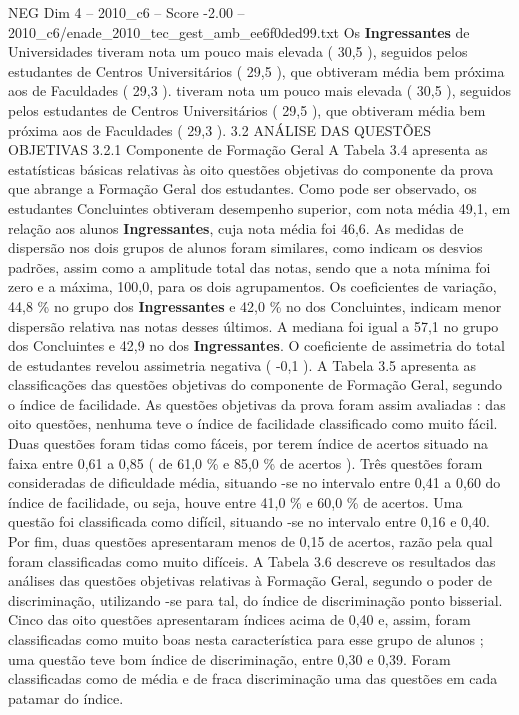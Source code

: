 \begin{textsample}{NEG Dim 4 – 2010\_c6 – Score -2.00 – 2010\_c6/enade\_2010\_tec\_gest\_amb\_ee6f0ded99.txt}
Os \textbf{Ingressantes} de Universidades tiveram nota um pouco mais elevada ( 30,5 ), seguidos pelos estudantes de Centros Universitários ( 29,5 ), que obtiveram média bem próxima aos de Faculdades ( 29,3 ). tiveram nota um pouco mais elevada ( 30,5 ), seguidos pelos estudantes de Centros Universitários ( 29,5 ), que obtiveram média bem próxima aos de Faculdades ( 29,3 ). 3.2 ANÁLISE DAS QUESTÕES OBJETIVAS 3.2.1 Componente de Formação Geral A Tabela 3.4 apresenta as estatísticas básicas relativas às oito questões objetivas do componente da prova que abrange a Formação Geral dos estudantes.
Como pode ser observado, os estudantes Concluintes obtiveram desempenho superior, com nota média 49,1, em relação aos alunos \textbf{Ingressantes}, cuja nota média foi 46,6.
As medidas de dispersão nos dois grupos de alunos foram similares, como indicam os desvios padrões, assim como a amplitude total das notas, sendo que a nota mínima foi zero e a máxima, 100,0, para os dois agrupamentos.
Os coeficientes de variação, 44,8 \% no grupo dos \textbf{Ingressantes} e 42,0 \% no dos Concluintes, indicam menor dispersão relativa nas notas desses últimos.
A mediana foi igual a 57,1 no grupo dos Concluintes e 42,9 no dos \textbf{Ingressantes}.
O coeficiente de assimetria do total de estudantes revelou assimetria negativa ( -0,1 ).
A Tabela 3.5 apresenta as classificações das questões objetivas do componente de Formação Geral, segundo o índice de facilidade.
As questões objetivas da prova foram assim avaliadas : das oito questões, nenhuma teve o índice de facilidade classificado como muito fácil.
Duas questões foram tidas como fáceis, por terem índice de acertos situado na faixa entre 0,61 a 0,85 ( de 61,0 \% e 85,0 \% de acertos ).
Três questões foram consideradas de dificuldade média, situando -se no intervalo entre 0,41 a 0,60 do índice de facilidade, ou seja, houve entre 41,0 \% e 60,0 \% de acertos.
Uma questão foi classificada como difícil, situando -se no intervalo entre 0,16 e 0,40.
Por fim, duas questões apresentaram menos de 0,15 de acertos, razão pela qual foram classificadas como muito difíceis.
A Tabela 3.6 descreve os resultados das análises das questões objetivas relativas à Formação Geral, segundo o poder de discriminação, utilizando -se para tal, do índice de discriminação ponto bisserial.
Cinco das oito questões apresentaram índices acima de 0,40 e, assim, foram classificadas como muito boas nesta característica para esse grupo de alunos ; uma questão teve bom índice de discriminação, entre 0,30 e 0,39.
Foram classificadas como de média e de fraca discriminação uma das questões em cada patamar do índice.

\end{textsample}

